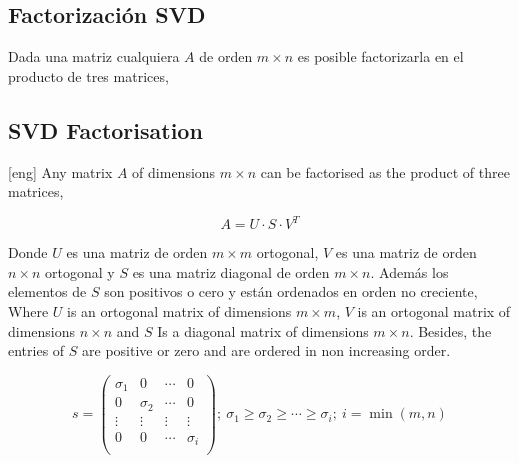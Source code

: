 \begin{paracol}{2}
\subsection{Factorización SVD}\label{sec:SVD}
Dada una matriz cualquiera $A$ de orden $m\times n$ es posible factorizarla en el producto de tres matrices,
\switchcolumn
\subsection{SVD Factorisation}\label{sec:SVD}[eng]
Any matrix $A$ of dimensions $m \times n$ can be factorised as the product of three matrices,
\end{paracol}
\begin{equation*}
A=U\cdot S \cdot V^T 
\end{equation*}
\begin{paracol}{2}
Donde $U$ es una matriz de orden $m\times m$ ortogonal, $V$ es una matriz de orden $n\times n$ ortogonal y $S$ es una matriz diagonal de orden $m\times n$. Además los elementos de $S$ son positivos o cero y están ordenados en orden no creciente,
\switchcolumn
Where $U$ is an ortogonal matrix of dimensions $m\times m$, $V$ is an ortogonal matrix of dimensions $n\times n$ and $S$ Is a diagonal matrix of dimensions $m \times n$. Besides, the entries of $S$ are positive or zero and are ordered in non increasing order. 
\end{paracol}
\begin{equation*}
s=\begin{pmatrix}
\sigma_1& 0& \cdots & 0\\
0 & \sigma_2& \cdots & 0\\
\vdots & \vdots & \vdots & \vdots \\
0& 0& \cdots & \sigma_i\\ 
\end{pmatrix}; \ \sigma_1 \geq \sigma_2 \geq \cdots \geq \sigma_i; \ i=\min(m,n)
\end{equation*}


